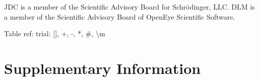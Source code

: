 \documentclass[9pt,lineno,final]{elife}
\newcommand{\beginsupplement}{%
        \setcounter{table}{0}
        \renewcommand{\thetable}{S\arabic{table}}%
        \setcounter{figure}{0}
        \renewcommand{\thefigure}{S\arabic{figure}}%
     }
\begin{document}
JDC is a member of the Scientific Advisory Board for Schr\"{o}dinger, LLC.
DLM is a member of the Scientific Advisory Board of OpenEye Scientific Software.

Table ref: \cite{ACD-pKa-galas, ACD-pKa-classic, simulation-plus-pKa, chemicalize-pKa, moka-pKa}
trial: [], +, -, *, \#, \textbackslash{}m






\newpage
\beginsupplement
\section{Supplementary Information}
\end{document}
